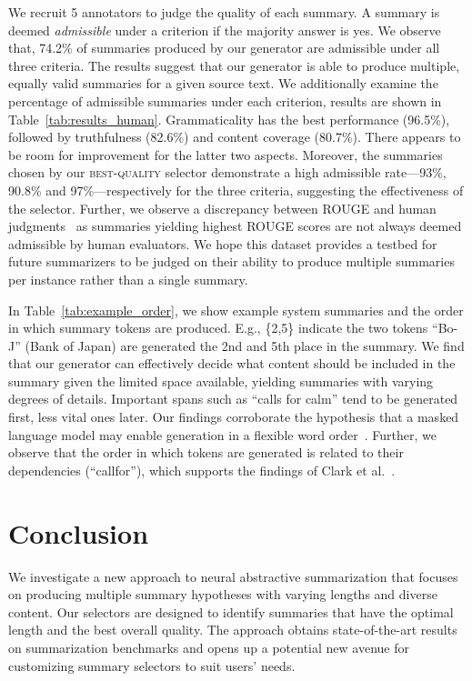 \documentclass[11pt]{article}
\begin{document}
We recruit 5 annotators to judge the quality of each summary.
A summary is deemed \emph{admissible} under a criterion if the majority answer is yes.
We observe that, 74.2\% of summaries produced by our generator are admissible under all three criteria. The results suggest that our generator is able to produce multiple, equally valid summaries for a given source text.
We additionally examine the percentage of admissible summaries under each criterion, results are shown in Table~\ref{tab:results_human}.
Grammaticality has the best performance (96.5\%), followed by truthfulness (82.6\%) and content coverage (80.7\%). There appears to be room for improvement for the latter two aspects.
Moreover, the summaries chosen by our \textsc{best-quality} selector demonstrate a high admissible rate—93\%, 90.8\% and 97\%—respectively for the three criteria, suggesting the effectiveness of the selector.
Further, we observe a discrepancy between ROUGE and human judgments~\cite{fabbri2020summeval} as summaries yielding highest ROUGE scores are not always deemed admissible by human evaluators.
We hope this dataset provides a testbed for future summarizers to be judged on their ability to produce multiple summaries per instance rather than a single summary.


In Table~\ref{tab:example_order}, we show example system summaries and the order in which summary tokens are produced.
E.g., \{2,5\} indicate the two tokens ``Bo-J'' (Bank of Japan) are generated the 2nd and 5th place in the summary.
We find that our generator can effectively decide what content should be included in the summary given the limited space available, yielding summaries with varying degrees of details.
Important spans such as ``calls for calm'' tend to be generated first, less vital ones later. 
Our findings corroborate the hypothesis that a masked language model may enable generation in a flexible word order~\cite{liao-etal-2020-probabilistically}.
Further, we observe that the order in which tokens are generated is related to their dependencies (``callfor''), which supports the findings of Clark et al.~.


\section{Conclusion}
\label{sec:conclusion}

We investigate a new approach to neural abstractive summarization that focuses on producing multiple summary hypotheses with varying lengths and diverse content.
Our selectors are designed to identify summaries that have the optimal length and the best overall quality.
The approach obtains state-of-the-art results on summarization benchmarks and opens up a potential new avenue for customizing summary selectors to suit users' needs.
\end{document}
